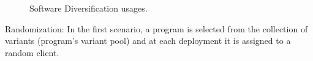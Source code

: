 \begin{figure}[h]
\begin{subfigure}[t]{0.45\textwidth}
    \end{subfigure}
    \caption{Software Diversification usages. }
\end{figure}

\begin{usage}{Randomization:}
    \label{usage:randomization}
    \normalfont
    In the first scenario, a program is selected from the collection of variants (program's variant pool) and at each deployment it is assigned to a random client. 

    
    
\end{usage}

